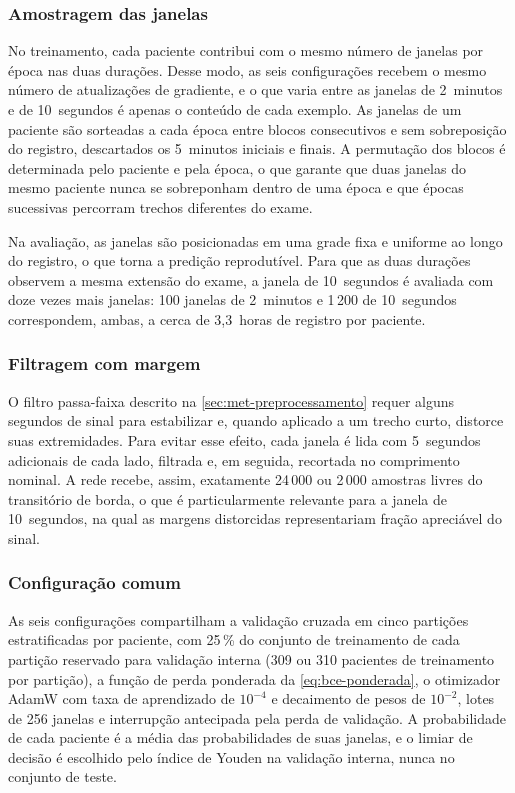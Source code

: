 \subsubsection{Amostragem das janelas}

No treinamento, cada paciente contribui com o mesmo número de janelas por
época nas duas durações. Desse modo, as seis configurações recebem o mesmo
número de atualizações de gradiente, e o que varia entre as janelas de
2~minutos e de 10~segundos é apenas o conteúdo de cada exemplo. As janelas
de um paciente são sorteadas a cada época entre blocos consecutivos e sem
sobreposição do registro, descartados os 5~minutos iniciais e finais. A
permutação dos blocos é determinada pelo paciente e pela época, o que
garante que duas janelas do mesmo paciente nunca se sobreponham dentro de
uma época e que épocas sucessivas percorram trechos diferentes do exame.

Na avaliação, as janelas são posicionadas em uma grade fixa e uniforme ao
longo do registro, o que torna a predição reprodutível. Para que as duas
durações observem a mesma extensão do exame, a janela de 10~segundos é
avaliada com doze vezes mais janelas: 100 janelas de 2~minutos e 1\,200 de
10~segundos correspondem, ambas, a cerca de 3,3~horas de registro por
paciente. %

\subsubsection{Filtragem com margem}

O filtro passa-faixa descrito na \autoref{sec:met-preprocessamento} requer
alguns segundos de sinal para estabilizar e, quando aplicado a um trecho
curto, distorce suas extremidades. Para evitar esse efeito, cada janela é
lida com 5~segundos adicionais de cada lado, filtrada e, em seguida,
recortada no comprimento nominal. A rede recebe, assim, exatamente 24\,000 ou
2\,000 amostras livres do transitório de borda, o que é particularmente
relevante para a janela de 10~segundos, na qual as margens distorcidas
representariam fração apreciável do sinal.

\subsubsection{Configuração comum}

As seis configurações compartilham a validação cruzada em cinco partições
estratificadas por paciente, com 25\,\% do conjunto de treinamento de cada
partição reservado para validação interna (309 ou 310 pacientes de
treinamento por partição), a função de perda ponderada da
\autoref{eq:bce-ponderada}, o otimizador AdamW com taxa de aprendizado de
$10^{-4}$ e decaimento de pesos de $10^{-2}$, lotes de 256 janelas e
interrupção antecipada pela perda de validação. %
A probabilidade de cada paciente é a média das probabilidades de suas
janelas, e o limiar de decisão é escolhido pelo índice de Youden na
validação interna, nunca no conjunto de teste.





